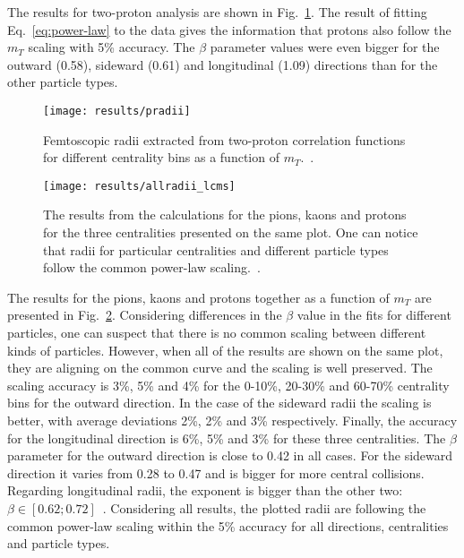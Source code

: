       The results for two-proton analysis are shown in Fig.~\ref{fig:pradii}.
      The result of fitting Eq.~\ref{eq:power-law} to the data gives the information that protons also follow the $m_T$ scaling with 5\% accuracy.
      The $\beta$ parameter values were even bigger for the outward (0.58), sideward (0.61) and longitudinal (1.09) directions than for the other particle types. 

      \begin{figure}[b]
        \centering
        \centerline{\texttt{[image: results/pradii]}}
        \caption{Femtoscopic radii extracted from two-proton correlation functions for different centrality bins as a function of $m_T$.~\cite{galazyn}.}
      \label{fig:pradii}
      \end{figure}

      \begin{figure}[b]
        \centering
        \centerline{\texttt{[image: results/allradii\_lcms]}}
        \caption{The results from the calculations for the pions, kaons and protons for the three centralities presented on the same plot. One can notice that radii for particular centralities and different particle types follow the common power-law scaling.~\cite{galazyn}.}
      \label{fig:allradii}
      \end{figure}    

      The results for the pions, kaons and protons together as a function of $m_T$ are presented in Fig.~\ref{fig:allradii}.
      Considering differences in the $\beta$ value in the fits for different particles, one can suspect that there is no common scaling between different kinds of particles.
      However, when all of the results are shown on the same plot, they are aligning on the common curve and the scaling is well preserved.
      The scaling accuracy is 3\%, 5\% and 4\% for the 0-10\%, 20-30\% and 60-70\% centrality bins for the outward direction.
      In the case of the sideward radii the scaling is better, with average deviations 2\%, 2\% and 3\% respectively.
      Finally, the accuracy for the longitudinal direction is 6\%, 5\% and 3\% for these three centralities.
      The $\beta$ parameter for the outward direction is close to 0.42 in all cases.
      For the sideward direction it varies from 0.28 to 0.47 and is bigger for more central collisions.
      Regarding longitudinal radii, the exponent is bigger than the other two: $\beta \in [0.62 ; 0.72]$~.
      Considering all results, the plotted radii are following the common power-law scaling within the 5\% accuracy for all directions, centralities and particle types.
      \FloatBarrier
